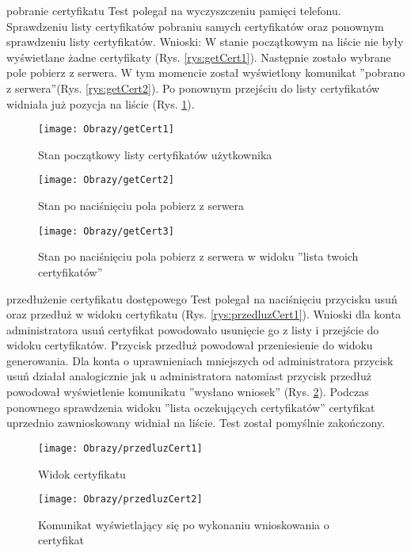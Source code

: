 \begin{enumerate*}
	\item   pobranie certyfikatu
	Test polegał na wyczyszczeniu pamięci telefonu. Sprawdzeniu listy certyfikatów pobraniu samych certyfikatów oraz ponownym sprawdzeniu listy certyfikatów.
	Wnioski: W stanie początkowym na liście nie były wyświetlane żadne certyfikaty (Rys. \ref{rys:getCert1}). Następnie zostało wybrane pole pobierz z serwera. W tym momencie został wyświetlony komunikat ''pobrano z serwera''(Rys. \ref{rys:getCert2}). Po ponownym przejściu do listy certyfikatów widniała już pozycja na liście (Rys. \ref{rys:getCert3}).
	\begin{figure}[ht!]
		\centering
		\begin{minipage}{0.2\textwidth}
			\texttt{[image: Obrazy/getCert1]}
			\caption{Stan początkowy listy certyfikatów użytkownika }
			\label{rys:getCert1}
		\end{minipage}
	\hspace{0.05\textwidth}
		\begin{minipage}{0.2\textwidth}
			\texttt{[image: Obrazy/getCert2]}
			\caption{Stan po naciśnięciu pola pobierz z serwera }
			\label{rys:getCert2}
		\end{minipage}
	\hspace{0.05\textwidth}
		\begin{minipage}{0.3\textwidth}
			\texttt{[image: Obrazy/getCert3]}
			\caption{Stan po naciśnięciu pola pobierz z serwera w widoku ''lista twoich certyfikatów''}
			\label{rys:getCert3}
		\end{minipage}
	\end{figure}

	\item  przedłużenie certyfikatu dostępowego
	Test polegał na naciśnięciu przycisku usuń oraz przedłuż w widoku certyfikatu (Rys. \ref{rys:przedluzCert1}).
	Wnioski dla konta administratora usuń certyfikat powodowało usunięcie go z listy i przejście do widoku certyfikatów. Przycisk przedłuż powodował przeniesienie do widoku generowania. Dla konta o uprawnieniach  mniejszych od administratora przycisk usuń działał analogicznie jak u administratora natomiast przycisk przedłuż powodował wyświetlenie komunikatu ''wysłano wniosek'' (Rys. \ref{rys:przedluzCert2}).
	Podczas ponownego sprawdzenia  widoku ''lista oczekujących certyfikatów'' certyfikat uprzednio zawnioskowany  widniał  na liście. Test został pomyślnie zakończony.
	
	\begin{figure}[ht!]
		\centering
		\begin{minipage}{0.25\textwidth}
			\texttt{[image: Obrazy/przedluzCert1]}
			\caption{Widok certyfikatu }
			\label{rys:przedluzCert1}
		\end{minipage}
	\hspace{0.02\textwidth}
		\begin{minipage}{0.5\textwidth}
			\texttt{[image: Obrazy/przedluzCert2]}
			\caption{Komunikat wyświetlający się po wykonaniu wnioskowania o certyfikat }
			\label{rys:przedluzCert2}
		\end{minipage}
	\end{figure}


\end{enumerate*}
